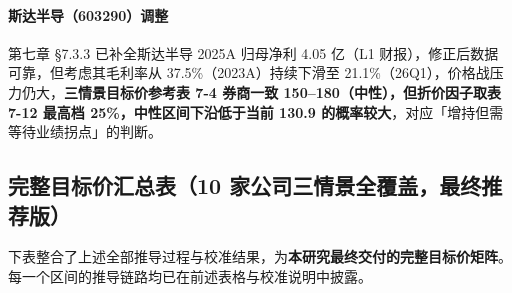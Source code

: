 \paragraph{斯达半导（603290）调整} 第七章 §7.3.3 已补全斯达半导 2025A 归母净利 4.05 亿（L1 财报），修正后数据可靠，但考虑其毛利率从 37.5\%（2023A）持续下滑至 21.1\%（26Q1），价格战压力仍大，\textbf{三情景目标价参考表 7-4 券商一致 150–180（中性），但折价因子取表 7-12 最高档 25\%，中性区间下沿低于当前 130.9 的概率较大}，对应「增持但需等待业绩拐点」的判断。

\subsection{完整目标价汇总表（10 家公司三情景全覆盖，最终推荐版）}

下表整合了上述全部推导过程与校准结果，为\textbf{本研究最终交付的完整目标价矩阵}。每一个区间的推导链路均已在前述表格与校准说明中披露。

